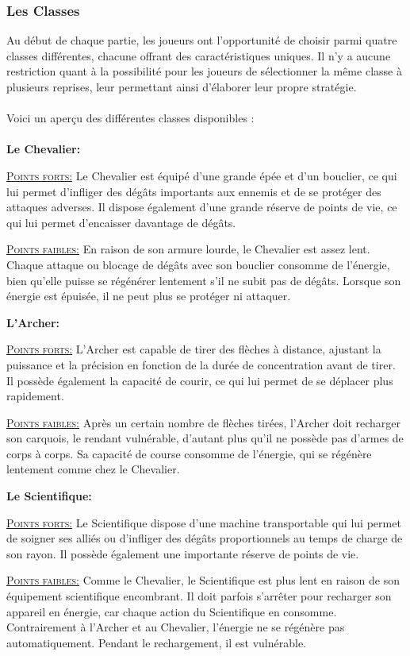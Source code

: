 \documentclass{article}
\begin{document}
\subsubsection{Les Classes}
Au début de chaque partie, les joueurs ont l'opportunité de choisir parmi quatre classes différentes, chacune offrant des caractéristiques uniques. Il n'y a aucune restriction quant à la possibilité pour les joueurs de sélectionner la même classe à plusieurs reprises, leur permettant ainsi d'élaborer leur propre stratégie.\\ \\
Voici un aperçu des différentes classes disponibles :\\ \\
\textbf{Le Chevalier:}
\begin{list}{}{\leftmargin 1cm} 
\item \textsc{\underline{Points forts:}}
Le Chevalier est équipé d'une grande épée et d'un bouclier, ce qui lui permet d'infliger des dégâts importants aux ennemis et de se protéger des attaques adverses. Il dispose également d'une grande réserve de points de vie, ce qui lui permet d'encaisser davantage de dégâts.
\item \textsc{\underline{Points faibles:}}
En raison de son armure lourde, le Chevalier est assez lent. Chaque attaque ou blocage de dégâts avec son bouclier consomme de l'énergie, bien qu'elle puisse se régénérer lentement s'il ne subit pas de dégâts. Lorsque son énergie est épuisée, il ne peut plus se protéger ni attaquer.
\end{list}
\textbf{L'Archer:}
\begin{list}{}{\leftmargin 1cm} 
\item \textsc{\underline{Points forts:}}
L'Archer est capable de tirer des flèches à distance, ajustant la puissance et la précision en fonction de la durée de concentration avant de tirer. Il possède également la capacité de courir, ce qui lui permet de se déplacer plus rapidement.
\item \textsc{\underline{Points faibles:}}
Après un certain nombre de flèches tirées, l'Archer doit recharger son carquois, le rendant vulnérable, d'autant plus qu'il ne possède pas d'armes de corps à corps. Sa capacité de course consomme de l'énergie, qui se régénère lentement comme chez le Chevalier.
\end{list}
\textbf{Le Scientifique:}
\begin{list}{}{\leftmargin 1cm} 
\item \textsc{\underline{Points forts:}}
Le Scientifique dispose d'une machine transportable qui lui permet de soigner ses alliés ou d'infliger des dégâts proportionnels au temps de charge de son rayon. Il possède également une importante réserve de points de vie.
\item \textsc{\underline{Points faibles:}}
Comme le Chevalier, le Scientifique est plus lent en raison de son équipement scientifique encombrant. Il doit parfois s'arrêter pour recharger son appareil en énergie, car chaque action du Scientifique en consomme. Contrairement à l'Archer et au Chevalier, l'énergie ne se régénère pas automatiquement. Pendant le rechargement, il est vulnérable.
\end{list}
\end{document}
